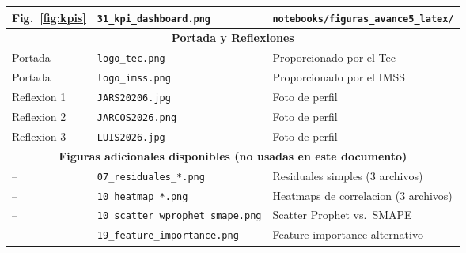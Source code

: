 \documentclass[12pt, letterpaper]{article}
\begin{document}
{\begin{longtable}{p{3.5cm} p{5cm} p{6.5cm}}
\midrule
Fig.~\ref{fig:kpis} & \texttt{31\_kpi\_dashboard.png} & \texttt{notebooks/figuras\_avance5\_latex/} \\
\midrule
\multicolumn{3}{c}{\textbf{Portada y Reflexiones}} \\
\midrule
Portada & \texttt{logo\_tec.png} & Proporcionado por el Tec \\
Portada & \texttt{logo\_imss.png} & Proporcionado por el IMSS \\
Reflexion 1 & \texttt{JARS20206.jpg} & Foto de perfil \\
Reflexion 2 & \texttt{JARCOS2026.png} & Foto de perfil \\
Reflexion 3 & \texttt{LUIS2026.jpg} & Foto de perfil \\
\midrule
\multicolumn{3}{c}{\textbf{Figuras adicionales disponibles (no usadas en este documento)}} \\
\midrule
-- & \texttt{07\_residuales\_*.png} & Residuales simples (3 archivos) \\
-- & \texttt{10\_heatmap\_*.png} & Heatmaps de correlacion (3 archivos) \\
-- & \texttt{10\_scatter\_wprophet\_smape.png} & Scatter Prophet vs.\ SMAPE \\
-- & \texttt{19\_feature\_importance.png} & Feature importance alternativo \\
\bottomrule
\end{longtable}
}
\end{document}
